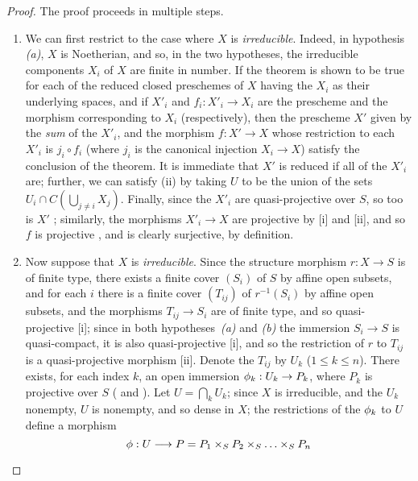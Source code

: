 \begin{proof}
\label{proof-2.5.6.1}
The proof proceeds in multiple steps.
\begin{enumerate}[label=(\Alph*)]
    \item We can first restrict to the case where $X$ is \emph{irreducible}.
        Indeed, in hypothesis \emph{(a)}, $X$ is Noetherian, and so, in the two hypotheses, the irreducible components $X_i$ of $X$ are finite in number.
        If the theorem is shown to be true for each of the reduced closed preschemes of $X$ having the $X_i$ as their underlying spaces, and if $X'_i$ and $f_i:X'_i\to X_i$ are the prescheme and the morphism corresponding to $X_i$ (respectively), then the prescheme $X'$ given by the \emph{sum} of the $X'_i$, and the morphism $f:X'\to X$ whose restriction to each $X'_i$ is $j_i\circ f_i$ (where $j_i$ is the canonical injection $X_i\to X$) satisfy the conclusion of the theorem.
        It is immediate that $X'$ is reduced if all of the $X'_i$ are;
        further, we can satisfy (ii) by taking $U$ to be the union of the sets $U_i\cap C\left(\bigcup_{j\neq i}X_j\right)$.
        Finally, since the $X'_i$ are quasi-projective over $S$, so too is $X'$
        ;
        similarly, the morphisms $X'_i\to X$ are projective by [i] and [ii], and so $f$ is projective , and is clearly surjective, by definition.
    \item Now suppose that $X$ is \emph{irreducible}.
        Since the structure morphism $r:X\to S$ is of finite type, there exists a finite cover $(S_i)$ of $S$ by affine open subsets, and for each $i$ there is a finite cover $(T_{ij})$ of $r^{-1}(S_i)$ by affine open subsets, and the morphisms $T_{ij}\to S_i$ are of finite type, and so quasi-projective [i];
        since in both hypotheses~\emph{(a)} and \emph{(b)} the immersion $S_i\to S$ is quasi-compact, it is also quasi-projective [i], and so the restriction of $r$ to $T_{ij}$ is a quasi-projective morphism [ii].
        Denote the $T_{ij}$ by $U_k$ ($1\leq k\leq n$).
        There exists, for each index $k$, an open immersion $\vphi_k:U_k\to P_k$, where $P_k$ is projective over $S$ ( and ).
        Let $U=\bigcap_k U_k$;
        since $X$ is irreducible, and the $U_k$ nonempty, $U$ is nonempty, and so dense in $X$;
        the restrictions of the $\phi_k$ to $U$ define a morphism
        \[
            \vphi:U\to P = P_1\times_S P_2\times_S\ldots\times_S P_n
        \]

\end{enumerate}
\end{proof}
